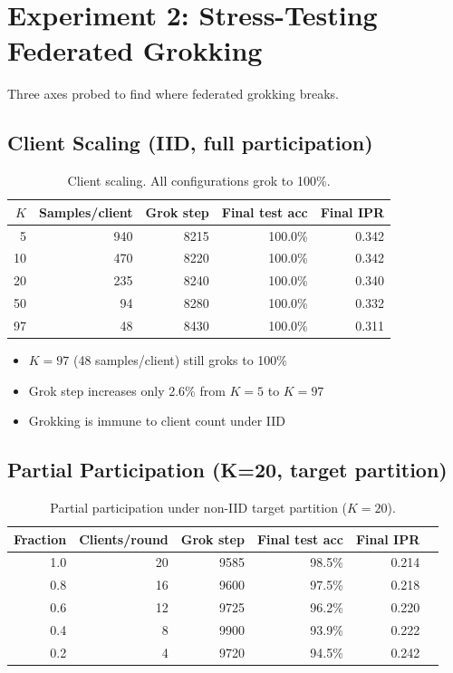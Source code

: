 \documentclass[11pt,a4paper]{article}
\begin{document}
\section{Experiment 2: Stress-Testing Federated Grokking}

Three axes probed to find where federated grokking breaks.

\subsection{Client Scaling (IID, full participation)}

\begin{table}[h]
\centering
\caption{Client scaling. All configurations grok to 100\%.}
\label{tab:clients}
\begin{tabular}{rrrrr}
\toprule
$K$ & Samples/client & Grok step & Final test acc & Final IPR \\
\midrule
5   & 940 & 8215 & 100.0\% & 0.342 \\
10  & 470 & 8220 & 100.0\% & 0.342 \\
20  & 235 & 8240 & 100.0\% & 0.340 \\
50  & 94  & 8280 & 100.0\% & 0.332 \\
97  & 48  & 8430 & 100.0\% & 0.311 \\
\bottomrule
\end{tabular}
\end{table}

\begin{itemize}
  \item $K{=}97$ (48 samples/client) still groks to 100\%
  \item Grok step increases only 2.6\% from $K{=}5$ to $K{=}97$
  \item Grokking is immune to client count under IID
\end{itemize}

\subsection{Partial Participation (K=20, target partition)}

\begin{table}[h]
\centering
\caption{Partial participation under non-IID target partition ($K{=}20$).}
\label{tab:participation}
\begin{tabular}{rrrrrr}
\toprule
Fraction & Clients/round & Grok step & Final test acc & Final IPR \\
\midrule
1.0 & 20 & 9585  & 98.5\% & 0.214 \\
0.8 & 16 & 9600  & 97.5\% & 0.218 \\
0.6 & 12 & 9725  & 96.2\% & 0.220 \\
0.4 & 8  & 9900  & 93.9\% & 0.222 \\
0.2 & 4  & 9720  & 94.5\% & 0.242 \\
\bottomrule
\end{tabular}
\end{table}
\end{document}
